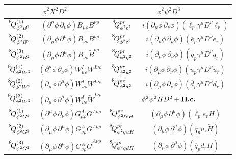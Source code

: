 \begin{table}[htbp]
\centering
\setlength{\tabcolsep}{1pt}
\renewcommand{\arraystretch}{1.5}
\begin{tabular}{ c|c||c|c }
\toprule
\multicolumn{2}{c||}{\cellcolor{hdrcolor}\hyperref[par:phi2X2D2]{\boldmath$\phi^2 X^2 D^2$}} & \multicolumn{2}{c}{\cellcolor{hdrcolor}\hyperref[par:phi2psi2D3]{\boldmath$\phi^2 \psi^2 D^3$}} 
\\
\hline
$\op{8}{\phi^2 B^2}{(1)}$ & $(\partial^\mu \phi\, \partial_\nu \phi)B_{\mu\rho}B^{\nu \rho}$ & $\op{8}{\phi^2 \ell^2}{pr}$ & $i(\partial_\mu \phi\, \partial_\nu \phi)(\overline \ell_p \gamma^\mu D^\nu \ell_r)$
\\
$\op{8}{\phi^2 B^2}{(2)}$ & $(\partial_\mu \phi \, \partial^\mu \phi)B_{\nu\rho}B^{\nu\rho}$ & $\op{8}{\phi^2 e^2}{pr}$ & $i(\partial_\mu \phi\, \partial_\nu \phi)(\overline e_p \gamma^\mu D^\nu e_r)$ 
\\
$\op{8}{\phi^2 B^2}{(3)}$ & $(\partial_\mu \phi \, \partial^\mu \phi)B_{\nu\rho}\widetilde B^{\nu\rho}$ & $\op{8}{\phi^2 q^2}{pr}$ & $i(\partial_\mu \phi\, \partial_\nu \phi)(\overline q_p \gamma^\mu D^\nu q_r)$
\\ 
$\op{8}{\phi^2 W^2}{(1)}$ & $(\partial^\mu \phi\, \partial_\nu \phi)W_{\mu\rho}^I W^{I \nu \rho}$ & $\op{8}{\phi^2 u^2}{pr}$ & $i(\partial_\mu \phi\, \partial_\nu \phi)(\overline u_p \gamma^\mu D^\nu u_r)$
\\ 
$\op{8}{\phi^2 W^2}{(2)}$ & $(\partial_\mu \phi \, \partial^\mu \phi)W_{\nu\rho}^I W^{I\nu\rho}$ & $\op{8}{\phi^2 d^2}{pr}$ & $i(\partial_\mu \phi\, \partial_\nu \phi)(\overline d_p \gamma^\mu D^\nu d_r)$
\\ \hhline{~|~||--}
$\op{8}{\phi^2 W^2}{(3)}$ & $(\partial_\mu \phi \, \partial^\mu \phi)W_{\nu\rho}^I \widetilde W^{I\nu\rho}$ & \multicolumn{2}{c}{\cellcolor{hdrcolor}\hyperref[par:phi2psi2HD2]{\boldmath$\phi^2 \psi^2 H D^2 + \text{\bf H.c.}$}} 
\\ \hhline{~|~||--}
$\op{8}{\phi^2 G^2}{(1)}$ & $(\partial^\mu \phi\, \partial_\nu \phi)G_{\mu\rho}^A G^{A\nu \rho}$ & $\op{8}{\phi^2 \ell e H}{pr}$ & $(\partial_\mu \phi \, \partial^\mu \phi)(\overline \ell_p e_r H) $ 
\\ 
$\op{8}{\phi^2 G^2}{(2)}$ & $(\partial_\mu \phi \, \partial^\mu \phi)G_{\nu\rho}^A G^{A\nu\rho}$ & $\op{8}{\phi^2 qu H}{pr}$ & $(\partial_\mu \phi \, \partial^\mu \phi)(\overline q_p u_r \widetilde H) $ 
\\
$\op{8}{\phi^2 G^2}{(3)}$ & $(\partial_\mu \phi \, \partial^\mu \phi)G_{\nu\rho}^A \widetilde G^{A\nu\rho}$ & $\op{8}{\phi^2 qd H}{pr}$ & $(\partial_\mu \phi \, \partial^\mu \phi)(\overline q_p d_r H) $

\end{tabular}
\end{table}
